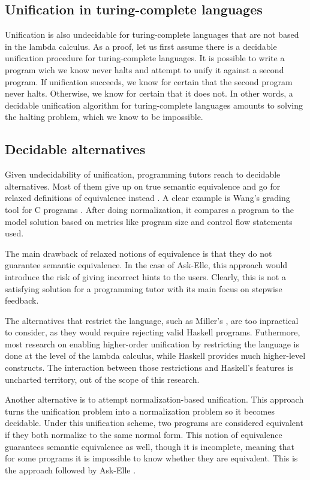 \subsection{Unification in turing-complete languages}

Unification is also undecidable for turing-complete languages that are not based in the lambda calculus. As a proof, let us first assume there is a decidable unification procedure for turing-complete languages. It is possible to write a program wich we know never halts and attempt to unify it against a second program. If unification succeeds, we know for certain that the second program never halts. Otherwise, we know for certain that it does not. In other words, a decidable unification algorithm for turing-complete languages amounts to solving the halting problem, which we know to be impossible.

\subsection{Decidable alternatives}

Given undecidability of unification, programming tutors reach to decidable alternatives. Most of them give up on true semantic equivalence and go for relaxed definitions of equivalence instead \cite{2016feedbackreview}. A clear example is Wang's grading tool for C programs \cite{2007wang}. After doing normalization, it compares a program to the model solution based on metrics like program size and control flow statements used.

The main drawback of relaxed notions of equivalence is that they do not guarantee semantic equivalence. In the case of Ask-Elle, this approach would introduce the risk of giving incorrect hints to the users. Clearly, this is not a satisfying solution for a programming tutor with its main focus on stepwise feedback.

The alternatives that restrict the language, such as Miller's \cite{1991miller}, are too inpractical to consider, as they would require rejecting valid Haskell programs. Futhermore, most research on enabling higher-order unification by restricting the language is done at the level of the lambda calculus, while Haskell provides much higher-level constructs. The interaction between those restrictions and Haskell's features is uncharted territory, out of the scope of this research.

Another alternative is to attempt normalization-based unification. This approach turns the unification problem into a normalization problem so it becomes decidable. Under this unification scheme, two programs are considered equivalent if they both normalize to the same normal form. This notion of equivalence guarantees semantic equivalence as well, though it is incomplete, meaning that for some programs it is impossible to know whether they are equivalent. This is the approach followed by Ask-Elle \cite{2010askelle}.

